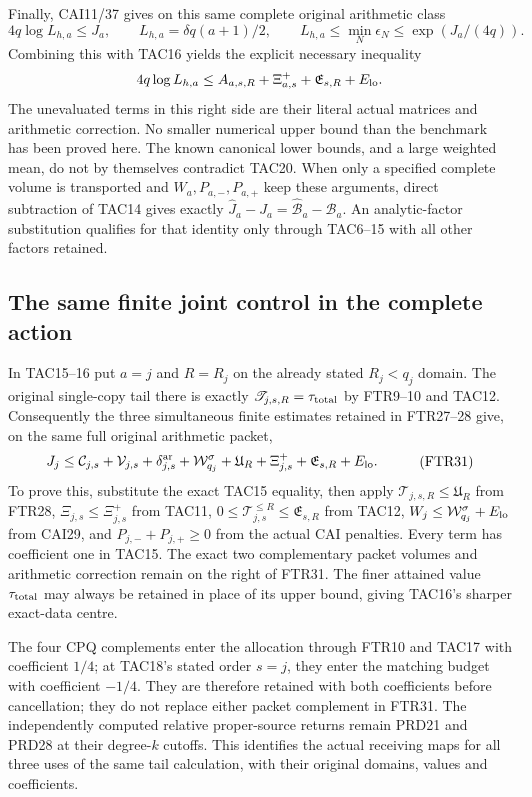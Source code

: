 \documentclass[11pt,a4paper]{article}
\begin{document}
Finally, CAI11/37 gives on this same complete original arithmetic class
\[
 4q\log L_{h,a}\le J_a,\qquad
 L_{h,a}=\delta q(a+1)/2,\qquad
 L_{h,a}\le\min_N\epsilon_N\le\exp(J_a/(4q)).
 \tag{TAC20}
\]
Combining this with TAC16 yields the explicit necessary inequality
\[
 4q\log L_{h,a}\le A_{a,s,R}+\Xi^+_{a,s}
                            +\mathfrak E_{s,R}+E_{\rm lo}.
\]
The unevaluated terms in this right side are their literal actual
matrices and arithmetic correction.  No smaller numerical upper bound
than the benchmark has been proved here.  The known canonical lower
bounds, and a large weighted mean, do not by themselves contradict
TAC20.  When only a specified complete volume is transported and
$W_a,P_{a,-},P_{a,+}$ keep these arguments, direct subtraction of
TAC14 gives exactly $\widehat J_a-J_a=\widehat{\mathcal B}_a-
\mathcal B_a$.  An analytic-factor substitution qualifies for that
identity only through TAC6--15 with all other factors retained.
\endgroup

\begingroup
\subsection{The same finite joint control in the complete action}
In TAC15--16 put $a=j$ and $R=R_j$ on the already stated
$R_j<q_j$ domain. The original single-copy tail there is exactly
$\mathscr T_{j,s,R}=\tau_{\rm total}$ by FTR9--10 and TAC12.
Consequently the three simultaneous finite estimates retained in
FTR27--28 give, on the same full original arithmetic packet,
\[
\begin{split}
 J_j\le{}&\mathcal C_{j,s}+\mathcal V_{j,s}
     +\delta_{j,s}^{\rm ar}+\mathcal W_{q_j}^{\sigma}
     +\mathfrak U_R+\Xi_{j,s}^{+}
     +\mathfrak E_{s,R}+E_{\rm lo}.                      
\end{split}\tag{FTR31}
\]
To prove this, substitute the exact TAC15 equality, then apply
$\mathscr T_{j,s,R}\le\mathfrak U_R$ from FTR28,
$\Xi_{j,s}\le\Xi_{j,s}^+$ from TAC11,
$0\le\mathcal T_{j,s}^{\le R}\le\mathfrak E_{s,R}$ from TAC12,
$W_j\le\mathcal W_{q_j}^{\sigma}+E_{\rm lo}$ from CAI29,
and $P_{j,-}+P_{j,+}\ge0$ from the actual CAI penalties.
Every term has coefficient one in TAC15. The exact two complementary
packet volumes and arithmetic correction remain on the right of FTR31.
The finer attained value $\tau_{\rm total}$ may always be retained
in place of its upper bound, giving TAC16's sharper exact-data centre.

The four CPQ complements enter the allocation through FTR10 and
TAC17 with coefficient $1/4$; at TAC18's stated order $s=j$,
they enter the matching budget with coefficient $-1/4$.
They are therefore retained with both
coefficients before cancellation; they do not replace either packet
complement in FTR31. The independently computed relative proper-source
returns remain PRD21 and PRD28 at their degree-$k$ cutoffs. This
identifies the actual receiving maps for all three uses of the same
tail calculation, with their original domains, values and coefficients.
\endgroup
\end{document}
